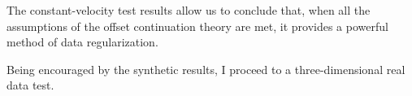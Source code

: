
\par
The constant-velocity test results allow us to conclude that, when all
the assumptions of the offset continuation theory are met, it provides
a powerful method of data regularization. 

Being encouraged by the synthetic results, I proceed to a
three-dimensional real data test.

\begin{comment}

\subsection{3-D data regularization with the offset continuation equation}

3-D differential offset continuation amounts to applying two
differential filters, operating on the in-line and cross-line
projections of the offset and midpoint coordinates. The corresponding
system of differential equations has the form
\begin{equation} 
\displaystyle
  \left\{\begin{array}{rcl} 
      \displaystyle
      h_1 \, \left( {\partial^2 \tilde{P} \over \partial y_1^2} - 
        {\partial^2 \tilde{P} \over \partial h_1^2} \right) - 
      i\,\Omega \, {\partial \tilde{P} \over   {\partial h_1}} & = & 0\;; \\
      \displaystyle
      h_2 \, \left( {\partial^2 \tilde{P} \over \partial y_2^2} - 
        {\partial^2 \tilde{P} \over \partial h_2^2} \right) - 
      i\,\Omega \, {\partial \tilde{P} \over   {\partial h_2}} & = & 0\;,
    \end{array}\right.
  \label{eqn:OC-3D} 
\end{equation}
where $y_1$ and $y_2$ correspond to the in-line and cross-line
midpoint coordinates, and $h_1$ and $h_2$ correspond to the in-line
and cross-line offsets.  The projection approach is justified in the
theory of azimuth moveout \cite[]{amo,GEO63-02-05740588}.
 

\end{comment}
